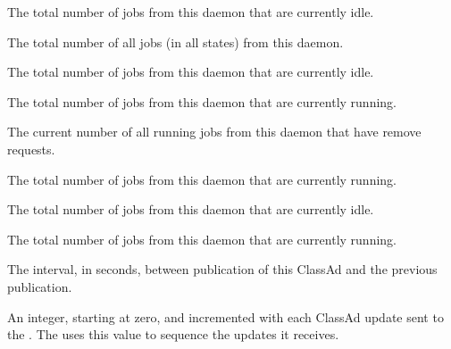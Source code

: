 \begin{description}
\item[\AdAttr{TotalIdleJobs}:] The total number of jobs from this
   daemon that are currently idle.

\item[\AdAttr{TotalJobAds}:] The total number of all jobs (in all 
  states) from this  daemon.

\item[\AdAttr{TotalLocalIdleJobs}:] The total number of 
    jobs from this
   daemon that are currently idle.

\item[\AdAttr{TotalLocalRunningJobs}:] The total number of 
    jobs from this
   daemon that are currently running.

\item[\AdAttr{TotalRemovedJobs}:] The current number of all running jobs
  from this  daemon that have remove requests.

\item[\AdAttr{TotalRunningJobs}:] The total number of jobs from this
   daemon that are currently running.

\item[\AdAttr{TotalSchedulerIdleJobs}:] The total number of 
    jobs from this
   daemon that are currently idle.

\item[\AdAttr{TotalSchedulerRunningJobs}:] The total number of 
    jobs from this
   daemon that are currently running.

\item[\AdAttr{UpdateInterval}:] The interval, in seconds,
  between publication of this  ClassAd and
  the previous publication.

\item[\AdAttr{UpdateSequenceNumber}:] An integer, starting at zero,
  and incremented with each ClassAd update sent to the .
  The  uses this value to sequence the updates it
  receives.


\end{description}
